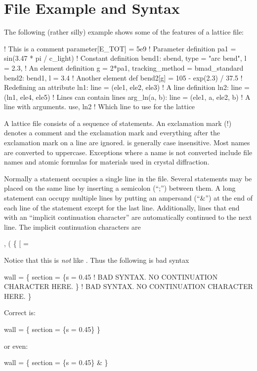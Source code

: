 \section{File Example and Syntax}

The following (rather silly) example shows some of the features of a
\bmad lattice file:
\begin{example}
  ! This is a comment
  parameter[E_TOT] = 5e9                   ! Parameter definition
  pa1 = sin(3.47 * pi / c_light)                 ! Constant definition
  bend1: sbend, type = "arc bend", l = 2.3,      ! An element definition
      g = 2*pa1, tracking_method = bmad_standard
  bend2: bend1, l = 3.4                          ! Another element def
  bend2[g] = 105 - exp(2.3) / 37.5               ! Redefining an attribute
  ln1: line = (ele1, ele2, ele3)                 ! A line definition
  ln2: line = (ln1, ele4, ele5)                  ! Lines can contain lines
  arg_ln(a, b): line = (ele1, a, ele2, b)        ! A line with arguments.
  use, ln2                                       ! Which line to use for the lattice
\end{example}

A \bmad lattice file consists of a sequence of statements. An
exclamation mark (!) denotes a comment and the exclamation mark and
everything after the exclamation mark on a line are ignored.  \bmad is
generally case insensitive. Most names are converted to
uppercase. Exceptions where a name is not converted include file names
and atomic formulas for materials used in crystal diffraction.

Normally a statement occupies a single line in the file. Several
statements may be placed on the same line by inserting a semicolon
(``;'') between them. A long statement can occupy multiple lines by
putting an ampersand (``\&'') at the end of each line of the statement
except for the last line. Additionally, lines that end with an
``implicit continuation character''
are automatically continued to the next line. The implicit continuation 
characters are
\begin{example}
  ,   (   \{   [   =
\end{example}
Notice
that this is {\em not} like . Thus the following is bad syntax
\begin{example}
  wall = \{
    section = \{s = 0.45     ! BAD SYNTAX. NO CONTINUATION CHARACTER HERE.
    \}                       ! BAD SYNTAX. NO CONTINUATION CHARACTER HERE.
  \}
\end{example}
Correct is:
\begin{example}
  wall = \{
    section = \{s = 0.45\} \}
\end{example}
or even:
\begin{example}
  wall = \{
    section = \{s = 0.45\} \&
  \}
\end{example}

